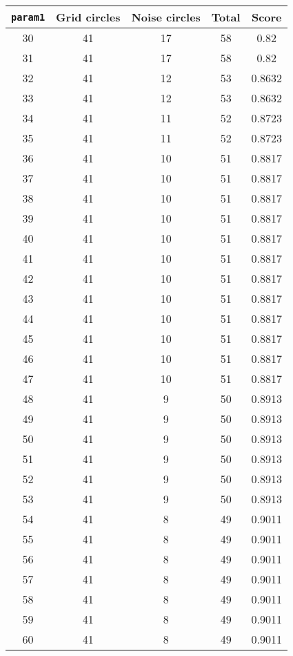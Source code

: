\documentclass[letterpaper, 12pt]{article}
\begin{document}
\begin{longtable}{|c|c|c|c|c|}
\hline
\textbf{\texttt{param1}} & \textbf{Grid circles} & \textbf{Noise circles} & \textbf{Total} & \textbf{Score} \\
\hline
30 & 41 & 17 & 58 & 0.82 \\
\hline
31 & 41 & 17 & 58 & 0.82 \\
\hline
32 & 41 & 12 & 53 & 0.8632 \\
\hline
33 & 41 & 12 & 53 & 0.8632 \\
\hline
34 & 41 & 11 & 52 & 0.8723 \\
\hline
35 & 41 & 11 & 52 & 0.8723 \\
\hline
36 & 41 & 10 & 51 & 0.8817 \\
\hline
37 & 41 & 10 & 51 & 0.8817 \\
\hline
38 & 41 & 10 & 51 & 0.8817 \\
\hline
39 & 41 & 10 & 51 & 0.8817 \\
\hline
40 & 41 & 10 & 51 & 0.8817 \\
\hline
41 & 41 & 10 & 51 & 0.8817 \\
\hline
42 & 41 & 10 & 51 & 0.8817 \\
\hline
43 & 41 & 10 & 51 & 0.8817 \\
\hline
44 & 41 & 10 & 51 & 0.8817 \\
\hline
45 & 41 & 10 & 51 & 0.8817 \\
\hline
46 & 41 & 10 & 51 & 0.8817 \\
\hline
47 & 41 & 10 & 51 & 0.8817 \\
\hline
48 & 41 & 9 & 50 & 0.8913 \\
\hline
49 & 41 & 9 & 50 & 0.8913 \\
\hline
50 & 41 & 9 & 50 & 0.8913 \\
\hline
51 & 41 & 9 & 50 & 0.8913 \\
\hline
52 & 41 & 9 & 50 & 0.8913 \\
\hline
53 & 41 & 9 & 50 & 0.8913 \\
\hline
54 & 41 & 8 & 49 & 0.9011 \\
\hline
55 & 41 & 8 & 49 & 0.9011 \\
\hline
56 & 41 & 8 & 49 & 0.9011 \\
\hline
57 & 41 & 8 & 49 & 0.9011 \\
\hline
58 & 41 & 8 & 49 & 0.9011 \\
\hline
59 & 41 & 8 & 49 & 0.9011 \\
\hline
60 & 41 & 8 & 49 & 0.9011 \\
\hline

\end{longtable}
\end{document}
